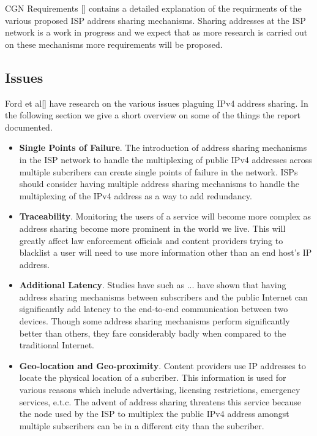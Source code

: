\documentclass[iwp,first]{luthesis}
\begin{document}
CGN Requirements [] contains a detailed explanation of the requirments of the various proposed ISP address sharing mechanisms. Sharing addresses at the ISP network is a work in progress and we expect that as more research is carried out on these mechanisms more requirements will be proposed. 

\subsection{Issues}
Ford et al[] have research on the various issues plaguing IPv4 address sharing. In the following section we give a short overview on some of the things the report documented.

\begin{itemize}

\item {\bf Single Points of Failure}. The introduction of address sharing mechanisms in the ISP network to handle the multiplexing of public IPv4 addresses across multiple subcribers can create single points of failure in the network. ISPs should consider having multiple address sharing mechanisms to handle the multiplexing of the IPv4 address as a way to add redundancy. 

\item {\bf Traceability}. Monitoring the users of a service will become more complex as address sharing become more prominent in the world we live. This will greatly affect law enforcement officials and content providers trying to blacklist a user will need to use more information other than an end host's IP address. 

\item  {\bf Additional Latency}. Studies have such as ... have shown that having address sharing mechanisms between subscribers and the public Internet can significantly add latency to the end-to-end communication between two devices. Though some address sharing mechanisms perform significantly better than others, they fare considerably badly when compared to the traditional Internet. 
 
\item {\bf Geo-location and Geo-proximity}. Content providers use IP addresses to locate the physical location of a subcriber. This information is used for various reasons which include advertising, licensing restrictions, emergency services, e.t.c. The advent of address sharing threatens this service because the node used by the ISP to multiplex the public IPv4 address amongst multiple subscribers can be in a different city than the subcriber.


\end{itemize}
\end{document}
